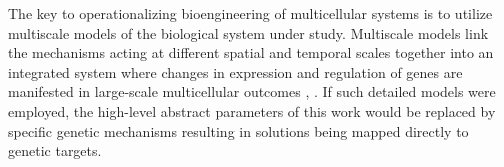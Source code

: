 The key to operationalizing bioengineering of multicellular systems is to utilize
multiscale models of the biological system under study. Multiscale models link the
mechanisms acting at different spatial and temporal scales together into an
integrated system where changes in expression and regulation of genes are manifested
in large-scale multicellular outcomes \cite{Martins2010Multiscale},
\cite{JosephWalpole2013Multiscale} \cite{Yu2016Multiclass}. If such detailed models
were employed, the high-level abstract parameters of this work would be replaced by
specific genetic mechanisms resulting in solutions being mapped directly to genetic
targets.


